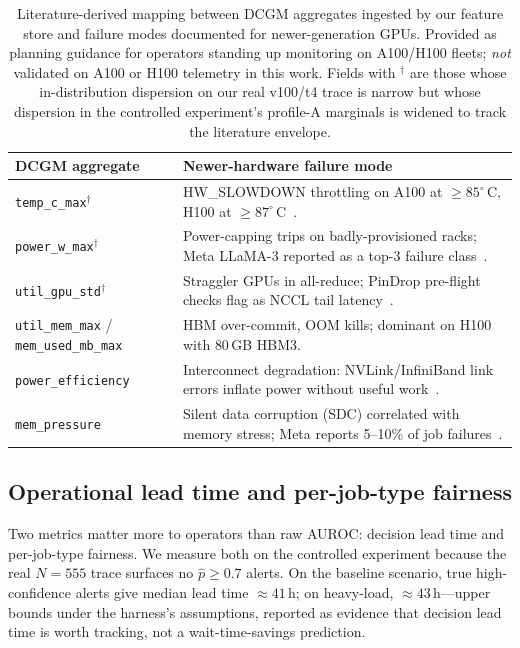 \documentclass[conference]{IEEEtran}
\begin{document}
\begin{table}[!htbp]
\caption{Literature-derived mapping between DCGM aggregates ingested by our feature store and failure modes documented for newer-generation GPUs. Provided as planning guidance for operators standing up monitoring on A100/H100 fleets; \emph{not} validated on A100 or H100 telemetry in this work. Fields with $^{\dagger}$ are those whose in-distribution dispersion on our real v100/t4 trace is narrow but whose dispersion in the controlled experiment's profile-A marginals is widened to track the literature envelope.}
\label{tab:dcgm-modes}
\centering
\small
\begin{tabular}{p{}p{}}
\toprule
DCGM aggregate & Newer-hardware failure mode \\
\midrule
\texttt{temp\_c\_max}$^{\dagger}$  & HW\_SLOWDOWN throttling on A100 at $\geq 85^{\circ}$\,C, H100 at $\geq 87^{\circ}$\,C~\cite{llama3,modal2025}. \\
\texttt{power\_w\_max}$^{\dagger}$ & Power-capping trips on badly-provisioned racks; Meta LLaMA-3 reported as a top-3 failure class~\cite{llama3}. \\
\texttt{util\_gpu\_std}$^{\dagger}$ & Straggler GPUs in all-reduce; PinDrop pre-flight checks flag as NCCL tail latency~\cite{pindrop2026}. \\
\texttt{util\_mem\_max} / \texttt{mem\_used\_mb\_max} & HBM over-commit, OOM kills; dominant on H100 with $80$\,GB HBM3. \\
\texttt{power\_efficiency} & Interconnect degradation: NVLink/InfiniBand link errors inflate power without useful work~\cite{modal2025}. \\
\texttt{mem\_pressure} & Silent data corruption (SDC) correlated with memory stress; Meta reports 5--10\% of job failures~\cite{llama3}. \\
\bottomrule
\end{tabular}
\end{table}

\subsection{Operational lead time and per-job-type fairness}
\label{sec:leadtime}
Two metrics matter more to operators than raw AUROC: decision lead time and per-job-type fairness. We measure both on the controlled experiment because the real $N{=}555$ trace surfaces no $\hat{p}\geq 0.7$ alerts. On the baseline scenario, true high-confidence alerts give median lead time $\approx 41$\,h; on heavy-load, $\approx 43$\,h---upper bounds under the harness's assumptions, reported as evidence that decision lead time is worth tracking, not a wait-time-savings prediction.
\end{document}
